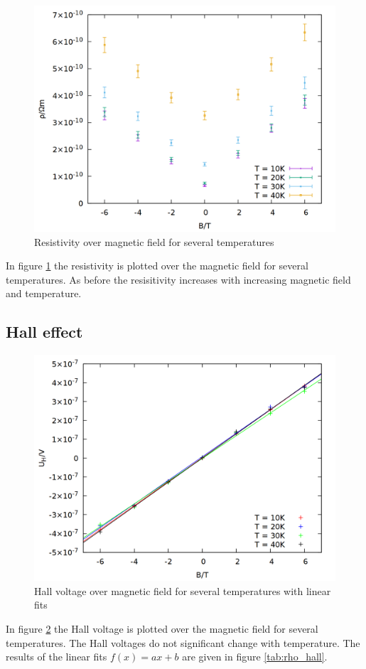 \begin{figure}
    \centering
    \includegraphics[width=0.7\linewidth]{data/rho_T.png}
    \caption{Resistivity over magnetic field for several temperatures}
    \label{fig:rho_T}
\end{figure}

In figure \ref{fig:rho_T} the resistivity is plotted over the magnetic field for several temperatures. As before the resisitivity increases with increasing magnetic field and temperature.

\subsection{Hall effect}

\begin{figure}
    \centering
    \includegraphics[width=0.7\linewidth]{data/rho_uh2_fit.png}
    \caption{Hall voltage over magnetic field for several temperatures with linear fits}
    \label{fig:rho_uh2_fit}
\end{figure}

In figure \ref{fig:rho_uh2_fit} the Hall voltage is plotted over the magnetic field for several temperatures. The Hall voltages do not significant change with temperature. The results of the linear fits $f(x) = ax + b$ are given in figure \ref{tab:rho_hall}.

